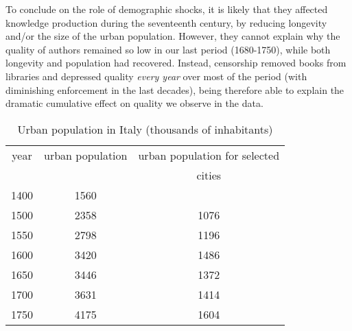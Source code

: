 To conclude on the role of demographic shocks, it is likely that they affected knowledge production during the seventeenth century, by reducing longevity and/or the size of the urban population. However, they cannot explain why the quality of authors remained so low in our last period (1680-1750), while both longevity and population had recovered. Instead, censorship removed books from libraries and depressed quality \textit{every year} over most of the period (with diminishing enforcement in the last decades), being therefore able to explain the dramatic cumulative effect on quality we observe in the data.



\begin{table}[htb]
      \centering %
\begin{tabular}{ccc}
\toprule
year  &   urban population  & urban population for selected\\
& \cite{buringh2021population} & cities \cite{alfani2019plague}\\
\midrule
1400	&	1560	&	                        \\
1500	&	2358	&	  1076                  \\
1550	&	2798	&	  1196                  \\
1600	&	3420	&	  1486                  \\
1650	&	3446	&	  1372                  \\
1700	&	3631	&	  1414                   \\
1750	&	4175     &   1604                   \\
\bottomrule
\end{tabular}
\caption{Urban population in Italy (thousands of inhabitants)}\label{tab:pop}
\end{table}


